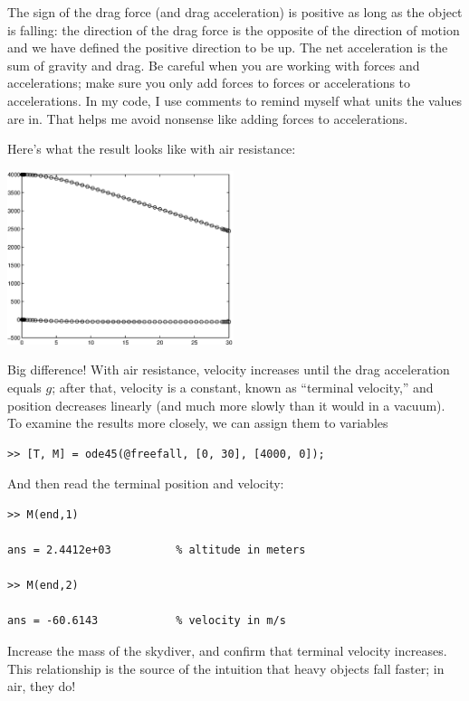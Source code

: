 \documentclass{book}
\begin{document}
The sign of the drag force (and drag acceleration) is positive as
long as the object is falling:  the direction of the drag force is
the opposite of the direction of motion and we have defined the 
positive direction to be
up.
The net
acceleration is the sum of gravity and drag.  Be careful when you
are working with forces and accelerations; make sure you only add
forces to forces or accelerations to accelerations.  In my code,
I use comments to remind myself what units the values are in.
That helps me avoid nonsense like adding forces to accelerations.

Here's what the result looks like with air resistance:

\beforefig \centerline{\includegraphics[height=2in]{figs/freefall2.eps}}

Big difference!  With air resistance, velocity increases until
the drag acceleration equals $g$; after that, velocity is a constant,
known as ``terminal velocity,'' and position decreases linearly
(and much more slowly than it would in a vacuum).  To examine
the results more closely, we can assign them to variables


\begin{verbatim}
>> [T, M] = ode45(@freefall, [0, 30], [4000, 0]);
\end{verbatim}

And then read the terminal position and velocity:

\begin{verbatim}
>> M(end,1)

ans = 2.4412e+03          % altitude in meters

>> M(end,2)

ans = -60.6143            % velocity in m/s
\end{verbatim}

\begin{ex}
Increase the mass of the skydiver, and confirm that
terminal velocity increases.  This relationship is the source of the
intuition that heavy objects fall faster; in air, they do!
\end{ex}
\end{document}
